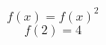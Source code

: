 \documentclass{article}
\begin{document}
\begin{equation} f(x) = f(x)^2 \end{equation}
\begin{equation} f(2) = 4 \end{equation}
\end{document}
